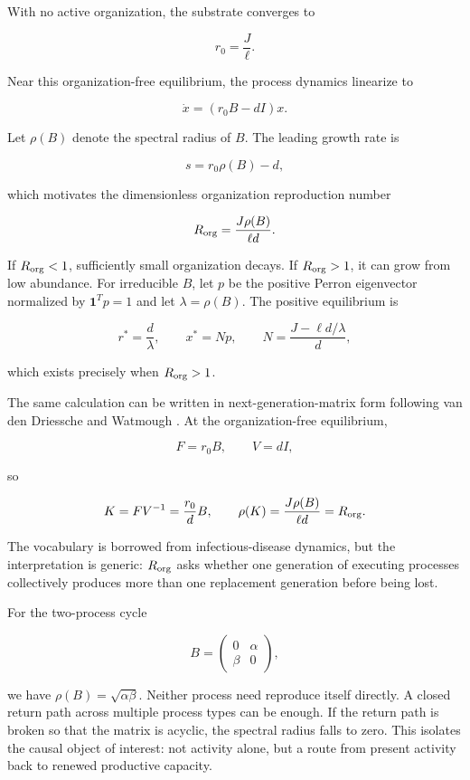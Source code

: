 \documentclass[11pt,a4paper]{article}
\begin{document}
With no active organization, the substrate converges to

\[
r_0 = \frac{J}{\ell}.
\]

Near this organization-free equilibrium, the process dynamics linearize
to

\[
\dot{x} = (r_0 B - dI)x.
\]

Let \(\rho(B)\) denote the spectral radius of \(B\). The leading growth
rate is

\[
s = r_0 \rho(B) - d,
\]

which motivates the dimensionless organization reproduction number

\begin{equation}
R_{\rm org}=\frac{J\rho(B)}{\ell d}.
\label{eq:Rorg}
\end{equation}

If \(R_{\rm org} < 1\), sufficiently small organization decays. If
\(R_{\rm org} > 1\), it can grow from low abundance. For irreducible
\(B\), let \(p\) be the positive Perron eigenvector normalized by
\(\mathbf{1}^T p = 1\) and let \(\lambda = \rho(B)\). The positive
equilibrium is

\[
r^* = \frac{d}{\lambda}, \qquad x^* = Np, \qquad N = \frac{J - \ell d/\lambda}{d},
\]

which exists precisely when \(R_{\rm org} > 1\).

The same calculation can be written in next-generation-matrix form following van den Driessche and Watmough \citep{VandenDriessche2002}. At the organization-free equilibrium,

\[
F = r_0 B, \qquad V = dI,
\]

so

\[
K = FV^{-1} = \frac{r_0}{d}B, \qquad \rho(K) = \frac{J\rho(B)}{\ell d} = R_{\rm org}.
\]

The vocabulary is borrowed from infectious-disease dynamics, but the
interpretation is generic: \(R_{\rm org}\) asks whether one generation
of executing processes collectively produces more than one replacement
generation before being lost.

For the two-process cycle

\[
B = \begin{pmatrix} 0 & \alpha \\ \beta & 0 \end{pmatrix},
\]

we have \(\rho(B) = \sqrt{\alpha\beta}\). Neither process need reproduce
itself directly. A closed return path across multiple process types can
be enough. If the return path is broken so that the matrix is acyclic,
the spectral radius falls to zero. This isolates the causal object of
interest: not activity alone, but a route from present activity back to
renewed productive capacity.
\end{document}
